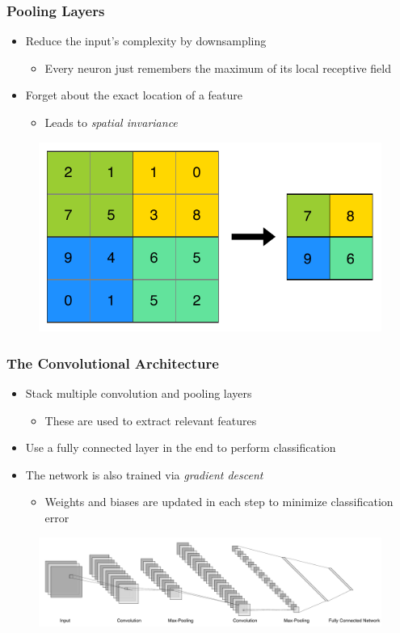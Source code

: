 \begin{frame}
  \frametitle{Pooling Layers}
  \begin{itemize}
    \item Reduce the input's complexity by downsampling
      \begin{itemize}
        \item Every neuron just remembers the maximum of its local
          receptive field
      \end{itemize}
    \item Forget about the exact location of a feature
      \begin{itemize}
        \item Leads to \textit{spatial invariance}
      \end{itemize}
  \end{itemize}
  \begin{figure}
    \includegraphics[width=.55\textwidth]{../figures/pooling}
  \end{figure}
\end{frame}

\begin{frame}
  \frametitle{The Convolutional Architecture}
  \begin{itemize}
    \item Stack multiple convolution and pooling layers
      \begin{itemize}
        \item These are used to extract relevant features
      \end{itemize}
    \item Use a fully connected layer in the end to perform
      classification
    \item The network is also trained via \textit{gradient descent}
      \begin{itemize}
        \item Weights and biases are updated in each step to minimize
          classification error
      \end{itemize}
  \end{itemize}
  \begin{figure}
    \includegraphics[width=\textwidth]{../figures/convnet}
  \end{figure}
\end{frame}
